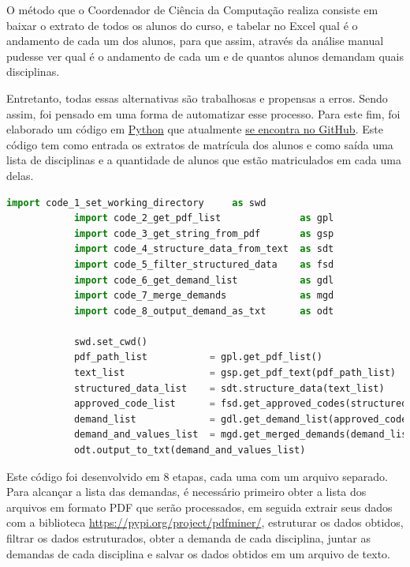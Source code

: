        O método que o Coordenador de Ciência da Computação realiza consiste em baixar o extrato de todos os alunos do curso, e tabelar no Excel qual é o andamento de cada um dos alunos, para que assim, através da análise manual pudesse ver qual é o andamento de cada um e de quantos alunos demandam quais disciplinas.

        Entretanto, todas essas alternativas são trabalhosas e propensas a erros. Sendo assim, foi pensado em uma forma de automatizar esse processo. Para este fim, foi elaborado um código em \href{https://www.python.org/}{Python} que atualmente \href{https://github.com/jvfd3/university_demand}{se encontra no GitHub}. Este código tem como entrada os extratos de matrícula dos alunos e como saída uma lista de disciplinas e a quantidade de alunos que estão matriculados em cada uma delas.

        \begin{lstlisting}[language=Python, caption={Obter demanda por extratos em PDF}]
            import code_1_set_working_directory     as swd
            import code_2_get_pdf_list              as gpl
            import code_3_get_string_from_pdf       as gsp
            import code_4_structure_data_from_text  as sdt
            import code_5_filter_structured_data    as fsd
            import code_6_get_demand_list           as gdl
            import code_7_merge_demands             as mgd
            import code_8_output_demand_as_txt      as odt

            swd.set_cwd()
            pdf_path_list           = gpl.get_pdf_list()
            text_list               = gsp.get_pdf_text(pdf_path_list)
            structured_data_list    = sdt.structure_data(text_list)
            approved_code_list      = fsd.get_approved_codes(structured_data_list)
            demand_list             = gdl.get_demand_list(approved_code_list)
            demand_and_values_list  = mgd.get_merged_demands(demand_list)
            odt.output_to_txt(demand_and_values_list)
        \end{lstlisting}

        Este código foi desenvolvido em 8 etapas, cada uma com um arquivo separado. Para alcançar a lista das demandas, é necessário primeiro obter a lista dos arquivos em formato PDF que serão processados, em seguida extrair seus dados com a biblioteca \href{PDFMiner}{https://pypi.org/project/pdfminer/}, estruturar os dados obtidos, filtrar os dados estruturados, obter a demanda de cada disciplina, juntar as demandas de cada disciplina e salvar os dados obtidos em um arquivo de texto.

